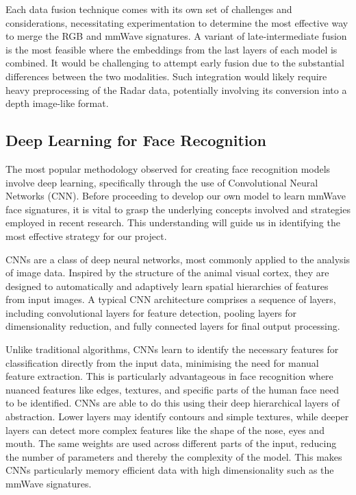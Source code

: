 \documentclass{interim}
\begin{document}
Each data fusion technique comes with its own set of challenges and considerations, necessitating experimentation to determine the most effective way to merge the RGB and mmWave signatures. A variant of late-intermediate fusion is the most feasible where the embeddings from the last layers of each model is combined. It would be challenging to attempt early fusion due to the substantial differences between the two modalities. Such integration would likely require heavy preprocessing of the Radar data, potentially involving its conversion into a depth image-like format. 


\subsection{Deep Learning for Face Recognition}
The most popular methodology observed for creating face recognition models involve deep learning, specifically through the use of Convolutional Neural Networks (CNN). Before proceeding to develop our own model to learn mmWave face signatures, it is vital to grasp the underlying concepts involved and strategies employed in recent research. This understanding will guide us in identifying the most effective strategy for our project.

CNNs are a class of deep neural networks, most commonly applied to the analysis of image data. Inspired by the structure of the animal visual cortex, they are designed to automatically and adaptively learn spatial hierarchies of features from input images. A typical CNN architecture comprises a sequence of layers, including convolutional layers for feature detection, pooling layers for dimensionality reduction, and fully connected layers for final output processing.

Unlike traditional algorithms, CNNs learn to identify the necessary features for classification directly from the input data, minimising the need for manual feature extraction. This is particularly advantageous in face recognition where nuanced features like edges, textures, and specific parts of the human face need to be identified. CNNs are able to do this using their deep hierarchical layers of abstraction. Lower layers may identify contours and simple textures, while deeper layers can detect more complex features like the shape of the nose, eyes and mouth. The same weights are used across different parts of the input, reducing the number of parameters and thereby the complexity of the model. This makes CNNs particularly memory efficient data with high dimensionality such as the mmWave signatures.
\end{document}
